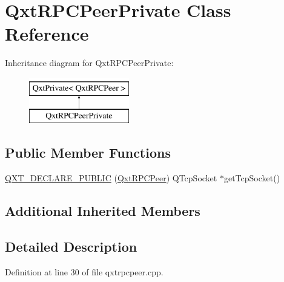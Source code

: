 \hypertarget{class_qxt_r_p_c_peer_private}{\section{Qxt\-R\-P\-C\-Peer\-Private Class Reference}
\label{class_qxt_r_p_c_peer_private}
}
Inheritance diagram for Qxt\-R\-P\-C\-Peer\-Private\-:\begin{figure}[H]
\begin{center}
\leavevmode
\includegraphics[height=2.000000cm]{class_qxt_r_p_c_peer_private}
\end{center}
\end{figure}
\subsection*{Public Member Functions}
\begin{DoxyCompactItemize}
\item 
\hyperlink{class_qxt_r_p_c_peer_private_a6c1bbadcf9a0a90cd3925629fcce4afe}{Q\-X\-T\-\_\-\-D\-E\-C\-L\-A\-R\-E\-\_\-\-P\-U\-B\-L\-I\-C} (\hyperlink{class_qxt_r_p_c_peer}{Qxt\-R\-P\-C\-Peer}) Q\-Tcp\-Socket $\ast$get\-Tcp\-Socket()
\end{DoxyCompactItemize}
\subsection*{Additional Inherited Members}


\subsection{Detailed Description}


Definition at line 30 of file qxtrpcpeer.\-cpp.



